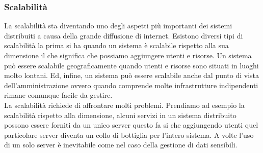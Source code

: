 \subsubsection{Scalabilità}
La scalabilità sta diventando uno degli aspetti più importanti dei sistemi distribuiti a causa della grande diffusione di internet. Esistono diversi tipi di scalabilità la prima si ha quando un sistema è scalabile rispetto alla sua dimensione il che significa che possiamo aggiungere utenti e risorse. Un sistema può essere scalabile geograficamente quando utenti e risorse sono situati in luoghi molto lontani.
Ed, infine, un sistema può essere scalabile anche dal punto di vista dell'amministrazione ovvero quando comprende molte infrastrutture indipendenti rimane comunque facile da gestire.\\
La scalabilità richiede di affrontare molti problemi. Prendiamo ad esempio la scalabilità rispetto alla dimensione, alcuni servizi in un sistema distribuito possono essere forniti da un unico server questo fa si che aggiungendo utenti quel particolare server diventa un collo di bottiglia per l'intero sistema. A volte l'uso di un solo server è inevitabile come nel caso della gestione di dati sensibili.
